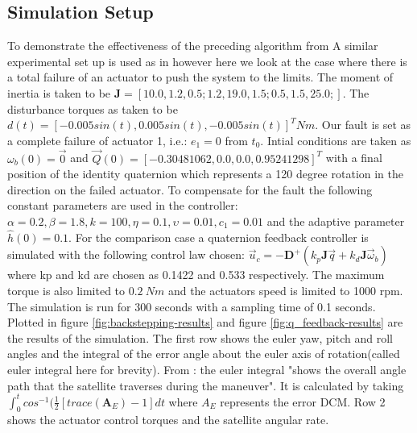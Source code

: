 \subsection{Simulation Setup}
To demonstrate the effectiveness of the preceding algorithm from \cite{shenActiveFaulttolerantControl2019} A similar experimental set up is used as in \cite{shenActiveFaulttolerantControl2019} however here we look at the case where there is a total failure of an actuator to push the system to the limits. The moment of inertia is taken to be $\mathbf{J} = [10.0, 1.2, 0.5; 1.2, 19.0, 1.5;  0.5, 1.5, 25.0;]$. The disturbance torques as taken to be 
\newline $d(t) = [-0.005 sin(t), 0.005 sin(t), -0.005 sin(t)]^T \unit{Nm}$. Our fault is set as a complete failure of actuator 1, i.e.: \newline $e_1 = 0$ from $t_0$. Intial conditions are taken as 
$\omega_b(0) = \vec{0}$ and $\vec{Q}(0) = [-0.30481062, 0.0, 0.0, 0.95241298]^T$ with a final position of the identity quaternion which represents a 120 degree rotation in the direction on the failed actuator.  To compensate for the fault the following constant parameters are used in the controller: 
\newline $\alpha=0.2, \beta = 1.8, k = 100, \eta = 0.1, \upsilon = 0.01, c_1 = 0.01$ and the adaptive parameter $\hat{h}(0) = 0.1$. For the comparison case a quaternion feedback controller is simulated with the following control law chosen: $\vec{u}_c = -\mathbf{D}^+ (k_p \mathbf{J} \vec{q} + k_d \mathbf{J} \vec{\omega}_b)$ where kp and kd are chosen as 0.1422 and 0.533 respectively. The maximum torque is also limited to $\SI{0.2}{Nm}$ and the actuators speed is limited to 1000 rpm. The simulation is run for 300 seconds with a sampling time of 0.1 seconds. 
Plotted in figure \ref{fig:backstepping-results} and figure \ref{fig:q_feedback-results} are the results of the simulation. The first row shows the euler yaw, pitch and roll angles and the integral of the error angle about the euler axis of rotation(called euler integral here for brevity). From \cite{sidiAttitudeDynamicsKinematics1997}: the euler integral  "shows the overall angle path that the satellite traverses during the maneuver". It is calculated by taking $\int_{0}^{t} cos^{-1}(\frac{1}{2}[trace(\mathbf{A}_E)-1] dt$ where $A_E$ represents the error DCM. Row 2 shows the actuator control torques and the satellite angular rate.
